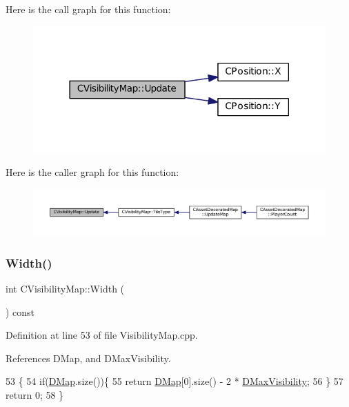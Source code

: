 Here is the call graph for this function\+:\nopagebreak
\begin{figure}[H]
\begin{center}
\leavevmode
\includegraphics[width=318pt]{classCVisibilityMap_a5ca9902ef0bc2714617719800e20aa19_cgraph}
\end{center}
\end{figure}
Here is the caller graph for this function\+:\nopagebreak
\begin{figure}[H]
\begin{center}
\leavevmode
\includegraphics[width=350pt]{classCVisibilityMap_a5ca9902ef0bc2714617719800e20aa19_icgraph}
\end{center}
\end{figure}
\hypertarget{classCVisibilityMap_ae916b942ca0d25d93eb8ecde5f08aef3}{}\label{classCVisibilityMap_ae916b942ca0d25d93eb8ecde5f08aef3} 
\subsubsection{\texorpdfstring{Width()}{Width()}}
{\footnotesize\ttfamily int C\+Visibility\+Map\+::\+Width (\begin{DoxyParamCaption}{ }\end{DoxyParamCaption}) const}



Definition at line 53 of file Visibility\+Map.\+cpp.



References D\+Map, and D\+Max\+Visibility.


\begin{DoxyCode}
53                                \{
54     \textcolor{keywordflow}{if}(\hyperlink{classCVisibilityMap_ad217bc34f7a50dd357a3eeeb69cfdd85}{DMap}.size())\{
55         \textcolor{keywordflow}{return} \hyperlink{classCVisibilityMap_ad217bc34f7a50dd357a3eeeb69cfdd85}{DMap}[0].size() - 2 * \hyperlink{classCVisibilityMap_ac8f71b9541c903fce0294d75daa1bbb1}{DMaxVisibility};
56     \}
57     \textcolor{keywordflow}{return} 0;
58 \}
\end{DoxyCode}


